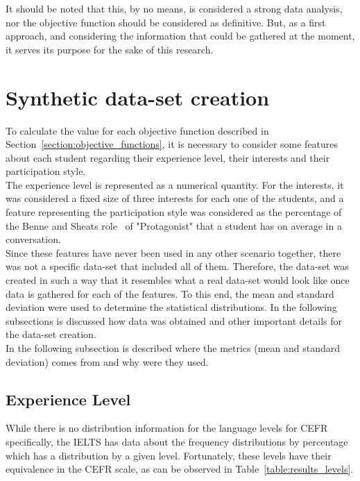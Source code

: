 It should be noted that this, by no means, is considered a strong data analysis, nor the objective function should be considered as definitive. But, as a first approach, and considering the information that could be gathered at the moment, it serves its purpose for the sake of this research.\\

\section{Synthetic data-set creation}

To calculate the value for each objective function described in Section~\ref{section:objective_functions}, it is necessary to consider some features about each student regarding their experience level, their interests and their participation style.\\

The experience level is represented as a numerical quantity. For the interests, it was considered a fixed size of three interests for each one of the students, and a feature representing the participation style was considered as the percentage of the Benne and Sheats role~\cite{FunctionalRoles} of "Protagonist" that a student has on average in a conversation.\\

Since these features have never been used in any other scenario together, there was not a specific data-set that included all of them. Therefore, the data-set was created in such a way that it resembles what a real data-set would look like once data is gathered for each of the features. To this end, the mean and standard deviation were used to determine the statistical distributions. In the following subsections is discussed how data was obtained and other important details for the data-set creation.\\

In the following subsection is described where the metrics (mean and standard deviation) comes from and why were they used.\\

\subsection{Experience Level} 

While there is no distribution information for the language levels for CEFR specifically, the IELTS has data about the frequency distributions by percentage~\cite{ielts_demographic_data_2018} which has a distribution by a given level. Fortunately, these levels have their equivalence in the CEFR scale, as can be observed in Table~\ref{table:results_levels}.\\

